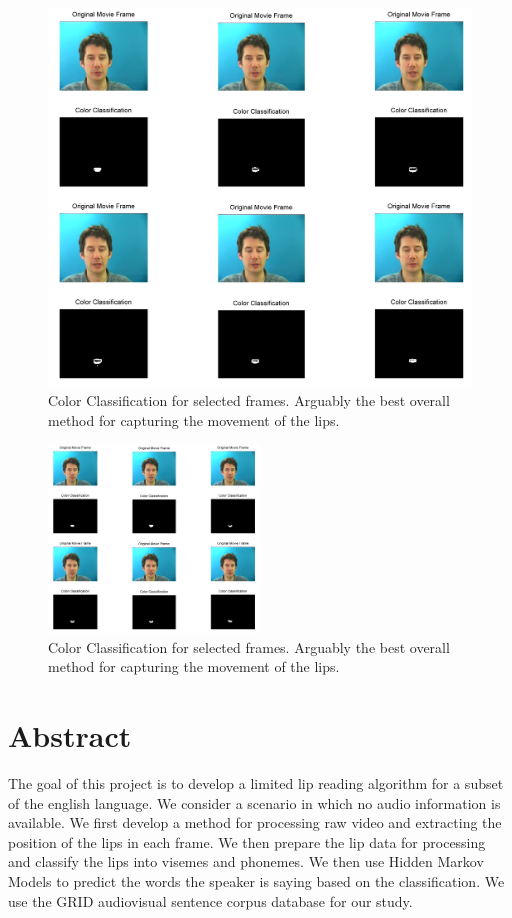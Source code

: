 \documentclass{article}
\begin{document}
\begin{figure}
	\centering
	\includegraphics[width=1\textwidth]{color1.png}
	\caption{Color Classification for selected frames. Arguably the best overall method for capturing the movement of the lips.}
\end{figure}

\begin{figure}
	\centering
	\includegraphics[width=0.5\textwidth]{color2.png}
	\caption{Color Classification for selected frames. Arguably the best overall method for capturing the movement of the lips.}
\end{figure}

\section*{Abstract}
The goal of this project is to develop a limited lip reading algorithm for a subset of the english language. We consider a scenario in which no audio information is available. We first develop a method for processing raw video and extracting the position of the lips in each frame. We then prepare the lip data for processing and classify the lips into visemes and phonemes. We then use Hidden Markov Models to predict the words the speaker is saying based on  the classification. We use the GRID audiovisual sentence corpus database for our study. 
\end{document}
